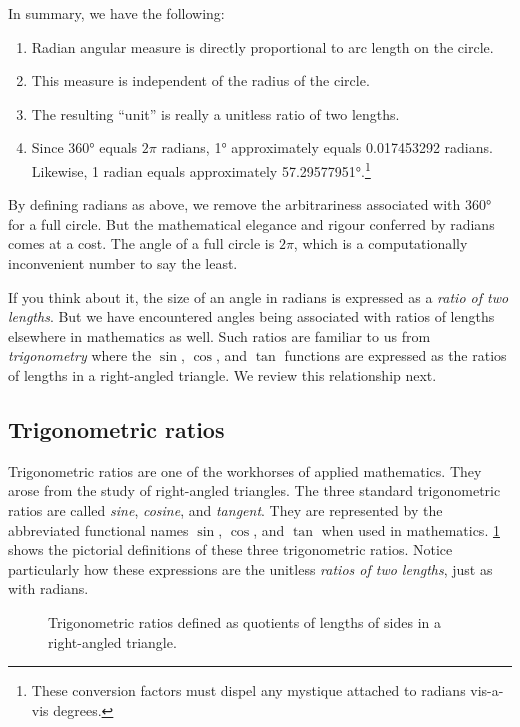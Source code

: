 \documentclass[
  a4paper,
]{article}
\providecommand{\tightlist}{%
  \setlength{\itemsep}{0pt}\setlength{\parskip}{0pt}}
\begin{document}
In summary, we have the following:

\begin{enumerate}
\tightlist
\item
  Radian angular measure is directly proportional to arc length on the
  circle.
\item
  This measure is independent of the radius of the circle.
\item
  The resulting ``unit'' is really a unitless ratio of two lengths.
\item
  Since 360° equals \(2\pi\) radians, 1° approximately equals
  0.017453292 radians. Likewise, 1 radian equals approximately
  57.29577951°.\footnote{These conversion factors must dispel any
    mystique attached to radians vis-a-vis degrees.}
\end{enumerate}

By defining radians as above, we remove the arbitrariness associated
with 360° for a full circle. But the mathematical elegance and rigour
conferred by radians comes at a cost. The angle of a full circle is
\(2\pi\), which is a computationally inconvenient number to say the
least.

If you think about it, the size of an angle in radians is expressed as a
\emph{ratio of two lengths}. But we have encountered angles being
associated with ratios of lengths elsewhere in mathematics as well. Such
ratios are familiar to us from \emph{trigonometry} where the \(\sin\),
\(\cos\), and \(\tan\) functions are expressed as the ratios of lengths
in a right-angled triangle. We review this relationship next.

\hypertarget{trigonometric-ratios}{%
\subsection{Trigonometric ratios}\label{trigonometric-ratios}}

Trigonometric ratios are one of the workhorses of applied mathematics.
They arose from the study of right-angled triangles. The three standard
trigonometric ratios are called \emph{sine}, \emph{cosine}, and
\emph{tangent}. They are represented by the abbreviated functional names
\(\sin\), \(\cos\), and \(\tan\) when used in mathematics.
\cref{fig:trig} shows the pictorial definitions of these three
trigonometric ratios. Notice particularly how these expressions are the
unitless \emph{ratios of two lengths}, just as with radians.

\begin{figure}
\hypertarget{fig:trig}{%
\centering

\caption{Trigonometric ratios defined as quotients of lengths of sides
in a right-angled triangle.}\label{fig:trig}
}
\end{figure}
\end{document}
